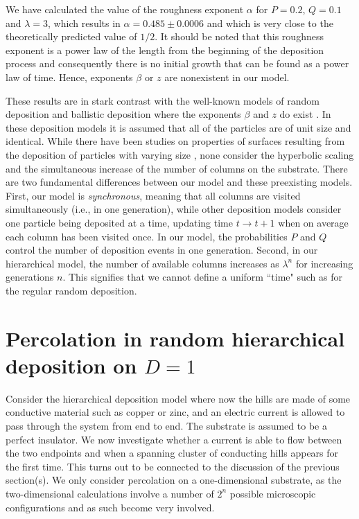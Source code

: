 \documentclass[amsmath,amssymb,amsfonts,aps,pre,preprint,superscriptaddress,bibnotes,showpacs,showkeys,longbibliography,nofootinbib]{revtex4-1}
\begin{document}
We have calculated the value of the roughness exponent $\alpha$ for $P = 0.2$, $Q = 0.1$ and $\lambda = 3$, which results in $\alpha = 0.485 \pm 0.0006$ and which is very close to the theoretically predicted value of $1/2$. It should be noted that this roughness exponent is a power law of the length from the beginning of the deposition process and consequently there is no initial growth that can be found as a power law of time. Hence, exponents $\beta$ or $z$ are nonexistent in our model.

These results are in stark contrast with the well-known models of random deposition and ballistic deposition where the exponents $\beta$ and $z$ do exist \cite{Edwards1982,KPZ,aharony2002}. In these deposition models it is assumed that all of the particles are of unit size and identical. While there have been studies on properties of surfaces resulting from the deposition of particles with varying size \cite{forgerini2009}, none consider the hyperbolic scaling and the simultaneous increase of the number of columns on the substrate. There are two fundamental differences between our model and these preexisting models. First, our model is \emph{synchronous}, meaning that all columns are visited simultaneously (i.e., in one generation), while other deposition models consider one particle being deposited at a time, updating time $t\rightarrow t+1$ when on average each column has been visited once. In our model, the probabilities $P$ and $Q$ control the number of deposition events in one generation. Second, in our hierarchical model, the number of available columns increases as $\lambda^n$ for increasing generations $n$. This signifies that we cannot define a uniform ``time" such as for the regular random deposition.

\section{Percolation in random hierarchical deposition on $D=1$}
\label{sec:percolation}       
Consider the hierarchical deposition model where now the hills are made of some conductive material such as copper or zinc, and an electric current is allowed to pass through the system from end to end. The substrate is assumed to be a perfect insulator. We now investigate whether a current is able to flow between the two endpoints and when a spanning cluster of conducting hills appears for the first time. This turns out to be connected to the  discussion of the previous section(s). We only consider percolation on a one-dimensional substrate, as the two-dimensional calculations involve a number of $2^n$ possible microscopic configurations and as such become very involved.
\end{document}
